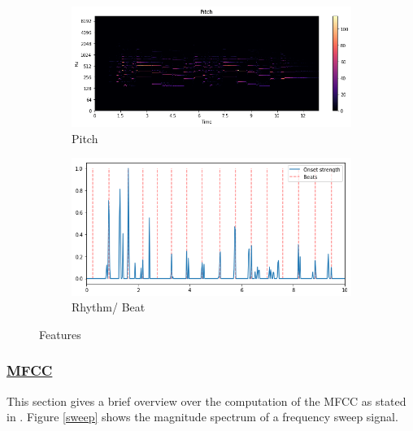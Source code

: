 \begin{figure}[htbp]
{{			\begin{subfigure}{.495\textwidth}
				\centering
				\includegraphics[scale=0.3]{Images/Layla/laylapitch.png}
				\caption{Pitch}
				\label{laylapitch}
			\end{subfigure}%
			\begin{subfigure}{.495\textwidth}
				\centering     
				\includegraphics[scale=0.3]{Images/Layla/laylabeat.png}
				\caption{Rhythm/ Beat}
				\label{laylacbeat}
			\end{subfigure}%
	}}
	\caption{Features}
	\label{fig:feat2}
\end{figure}

\subsubsection{\underline{MFCC}}\label{mfccsim}

This section gives a brief overview over the computation of the MFCC as stated in \cite[pp. 55ff]{knees1}.
Figure \ref{sweep} shows the magnitude spectrum of a frequency sweep signal.

